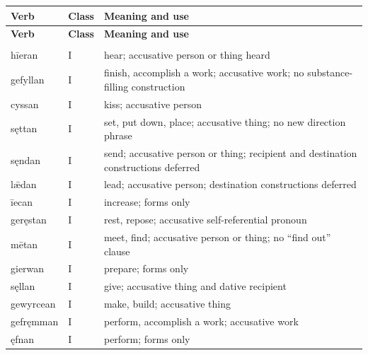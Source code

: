 \par\begingroup
\fontsize{10.5}{13.2}\selectfont
\setlength{\LTleft}{0pt}\setlength{\LTright}{\fill}
\begin{longtable}{@{}>{\raggedright\arraybackslash}p{25mm}>{\raggedright\arraybackslash}p{11mm}>{\raggedright\arraybackslash}p{81mm}@{}}
\toprule
\textbf{Verb} & \textbf{Class} & \textbf{Meaning and use} \\
\midrule
\endfirsthead
\toprule
\textbf{Verb} & \textbf{Class} & \textbf{Meaning and use} \\
\midrule
\endhead
\midrule
\multicolumn{3}{r}{\footnotesize Continued on the following page.}\\
\endfoot
\bottomrule
\endlastfoot
hīeran & I & hear; accusative person or thing heard \\
gefyllan & I & finish, accomplish a work; accusative work; no substance-filling construction \\
cyssan & I & kiss; accusative person \\
sęttan & I & set, put down, place; accusative thing; no new direction phrase \\
sęndan & I & send; accusative person or thing; recipient and destination constructions deferred \\
lǣdan & I & lead; accusative person; destination constructions deferred \\
īecan & I & increase; forms only \\
geręstan & I & rest, repose; accusative self-referential pronoun \\
mētan & I & meet, find; accusative person or thing; no “find out” clause \\
gierwan & I & prepare; forms only \\
sęllan & I & give; accusative thing and dative recipient \\
gewyrcean & I & make, build; accusative thing \\
gefręmman & I & perform, accomplish a work; accusative work \\
ęfnan & I & perform; forms only \\

\end{longtable}
